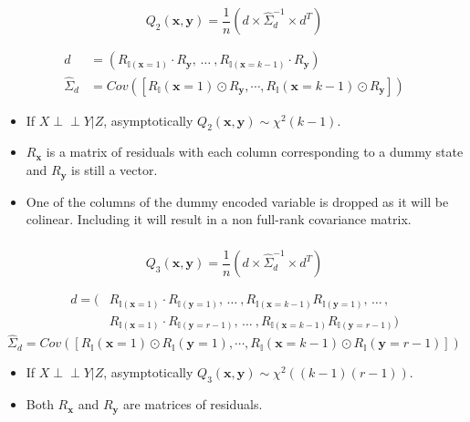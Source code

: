\documentclass{beamer}
\def\ci{\perp\!\!\!\!\!\perp}
\begin{document}
\begin{frame}
	\frametitle{}
	$$ Q_2(\bm{x}, \bm{y}) = \frac{1}{n} (d \times \hat{\Sigma}_d^{-1} \times d^T) $$

	\begin{equation*}
		\begin{split}
		d &= (R_{\mathbb{I}(\mathbf{x}=1)} \cdot R_{\mathbf{y}}, \, \ldots \ , R_{\mathbb{I}(\mathbf{x}=k-1)} \cdot R_{\mathbf{y}}) \\ 
		\hat{\Sigma}_d &= Cov([R_\mathbb{I}(\mathbf{x}=1) \odot R_\mathbf{y}, \cdots, R_\mathbb{I}(\mathbf{x}=k-1) \odot R_\mathbf{y}])
		\end{split}
	\end{equation*}
	\begin{center}
		\begin{itemize}
			\item If $ X \ci Y | Z $, asymptotically $ Q_2(\bm{x}, \bm{y}) \sim \chi^2(k-1) $.
			\item $ R_{\bm{x}} $ is a matrix of residuals with each column corresponding to a dummy state and $ R_{\bm{y}} $ is still a vector.
			\item One of the columns of the dummy encoded variable
				is dropped as it will be colinear. Including it will
				result in a non full-rank covariance matrix.
		\end{itemize}
	\end{center}
\end{frame}

\begin{frame}
	\frametitle{}

	$$ Q_3(\bm{x}, \bm{y}) = \frac{1}{n} (d \times \hat{\Sigma}_d^{-1} \times d^T) $$

	\begin{equation*}
		\begin{split}
		d = (&R_{\mathbb{I}(\mathbf{x}=1)} \cdot R_{\mathbb{I}(\mathbf{y}=1)}, \, \ldots \ ,
				R_{\mathbb{I}(\mathbf{x}=k-1)} R_{\mathbb{I}(\mathbf{y}=1)}, \, \ldots \, , \\
		     &R_{\mathbb{I}(\mathbf{x}=1)} \cdot R_{\mathbb{I}(\mathbf{y}=r-1)}, \, \ldots \ ,
				R_{\mathbb{I}(\mathbf{x}=k-1)} R_{\mathbb{I}(\mathbf{y}=r-1)}) 
		\end{split}
	\end{equation*}
	\begin{equation*}
		\hat{\Sigma}_d = Cov([R_\mathbb{I}(\mathbf{x}=1) \odot R_\mathbb{I}(\mathbf{y}=1), \cdots, R_\mathbb{I}(\mathbf{x}=k-1) \odot R_\mathbb{I}(\mathbf{y}=r-1)])
	\end{equation*}

	\begin{center}
		\begin{itemize}
			\item If $ X \ci Y | Z $, asymptotically $ Q_3(\bm{x}, \bm{y}) \sim \chi^2((k-1)(r-1)) $.
			\item Both $ R_{\bm{x}} $ and $ R_{\bm{y}} $ are matrices of residuals.
		\end{itemize}
	\end{center}

\end{frame}
\end{document}
